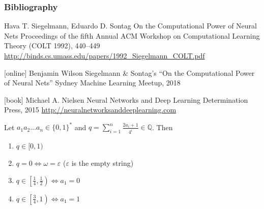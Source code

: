 \documentclass{beamer}
\newcommand{\Q}{\mathbb{Q}}
\begin{document}
\begin{frame}
	\frametitle{Bibliography}
	\small
		\begin{thebibliography}{}
			\bibitem{} Hava T. Siegelmann, Eduardo D. Sontag
			\newblock On the Computational Power of Neural Nets
			\newblock Proceedings of the fifth Annual ACM Workshop on Computational Learning Theory (COLT 1992), 440--449
			\newblock \url{http://binds.cs.umass.edu/papers/1992_Siegelmann_COLT.pdf}
			
			\bibitem{} Benjamin Wilson
			\newblock Siegelmann \& Sontag's ``On the Computational Power of Neural Nets''
			\newblock Sydney Machine Learning Meetup, 2018
			
			[book]
			\bibitem{} Michael A. Nielsen
			\newblock Neural Networks and Deep Learning
			\newblock Determination Press, 2015
			\newblock \url{http://neuralnetworksanddeeplearning.com}
		\end{thebibliography}
\end{frame}

\begin{frame}
	\begin{lemma}[Properties of $q$]
		Let $a_1a_2\dots a_n\in\{0,1\}^*$ and $\displaystyle{q=\sum_{i=1}^{n}\frac{2a_i+1}{4^i}\in\Q}$. Then
		\begin{enumerate}
			\item$q\in[0,1)$
			\item$q=0 \iff \omega=\varepsilon$ ($\varepsilon$ is the empty string)
			\item$q\in\left[\frac{1}{4},\frac{1}{2}\right)\iff a_1=0$
			\item$q\in\left[\frac{3}{4},1\right)\iff a_1=1$
		\end{enumerate}
	\end{lemma}
\end{frame}

\theoremstyle{definition}
\newtheorem{teorema}[theorem]{Theorem}
\end{document}
